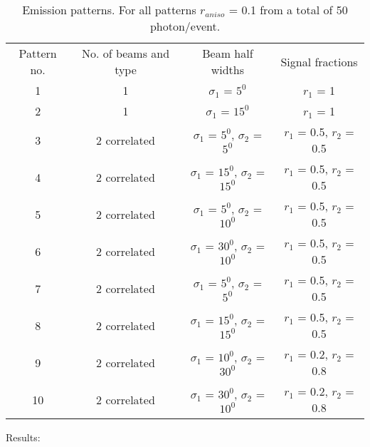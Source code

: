 \begin{table}[h]
  \centering
  \caption{Emission patterns. For all patterns $r_{aniso}$ = 0.1 from a 
  total of 50 photon/event.}
  \label{tab:AnisoPattern}
  \begin{tabular}{|c | c| c | c|}
  \hline
  Pattern no. & No. of beams and type & Beam half widths & Signal fractions \\
  1 & 1 & $\sigma_1$ = $5^{0}$ & $r_1$ = 1 \\
   2 & 1 & $\sigma_1$ = $15^{0}$ & $r_1$ = 1 \\
   3 & 2 correlated & $\sigma_1$ = $5^{0}$, $\sigma_2$ = $5^{0}$ & $r_1$ = 0.5, $r_2$ = 0.5  \\
   4 & 2 correlated & $\sigma_1$ = $15^{0}$, $\sigma_2$ = $15^{0}$ & $r_1$ = 0.5, $r_2$ = 0.5 \\
   5 & 2 correlated & $\sigma_1$ = $5^{0}$, $\sigma_2$ = $10^{0}$ & $r_1$ = 0.5, $r_2$ = 0.5 \\
   6 & 2 correlated & $\sigma_1$ = $30^{0}$, $\sigma_2$ = $10^{0}$ & $r_1$ = 0.5, $r_2$ = 0.5 \\
   7 & 2 correlated & $\sigma_1$ = $5^{0}$, $\sigma_2$ = $5^{0}$ & $r_1$ = 0.5, $r_2$ = 0.5 \\
   8 & 2 correlated & $\sigma_1$ = $15^{0}$, $\sigma_2$ = $15^{0}$ & $r_1$ = 0.5, $r_2$ = 0.5 \\
   9 & 2 correlated & $\sigma_1$ = $10^{0}$, $\sigma_2$ = $30^{0}$ & $r_1$ = 0.2, $r_2$ = 0.8 \\
    10 & 2 correlated & $\sigma_1$ = $30^{0}$, $\sigma_2$ = $10^{0}$ & $r_1$ = 0.2, $r_2$ = 0.8 \\
  \hline
 \end{tabular}
\end{table}

Results: